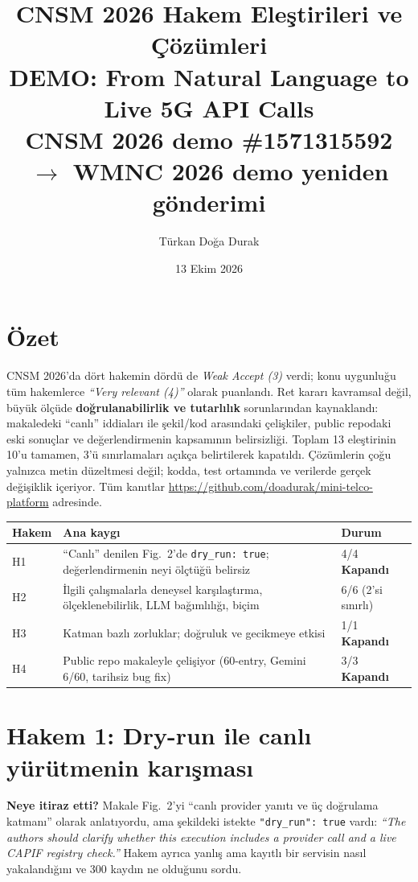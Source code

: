 \documentclass[10pt,a4paper]{article}
\title{\textbf{CNSM 2026 Hakem Eleştirileri ve Çözümleri}\\[2pt]
\large DEMO: From Natural Language to Live 5G API Calls\\
\normalsize CNSM 2026 demo \#1571315592 $\rightarrow$ WMNC 2026 demo yeniden gönderimi}
\author{Türkan Doğa Durak}
\date{13 Ekim 2026}
\newcommand{\ok}{\textcolor{green!50!black}{\textbf{Kapandı}}}
\newcommand{\q}[1]{\textit{``#1''}}
\begin{document}
\maketitle

\section*{Özet}
CNSM 2026'da dört hakemin dördü de \textit{Weak Accept (3)} verdi; konu uygunluğu tüm hakemlerce
\q{Very relevant (4)} olarak puanlandı. Ret kararı kavramsal değil, büyük ölçüde \textbf{doğrulanabilirlik ve
tutarlılık} sorunlarından kaynaklandı: makaledeki ``canlı'' iddiaları ile şekil/kod arasındaki çelişkiler,
public repodaki eski sonuçlar ve değerlendirmenin kapsamının belirsizliği. Toplam 13 eleştirinin 10'u tamamen,
3'ü sınırlamaları açıkça belirtilerek kapatıldı. Çözümlerin çoğu yalnızca metin düzeltmesi değil; kodda,
test ortamında ve verilerde gerçek değişiklik içeriyor. Tüm kanıtlar
\url{https://github.com/doadurak/mini-telco-platform} adresinde.

\begin{table}[h]
\centering\small
\begin{tabularx}{\textwidth}{l L l}
\toprule
\textbf{Hakem} & \textbf{Ana kaygı} & \textbf{Durum} \\
\midrule
H1 & ``Canlı'' denilen Fig.~2'de \texttt{dry\_run: true}; değerlendirmenin neyi ölçtüğü belirsiz & 4/4 \ok \\
H2 & İlgili çalışmalarla deneysel karşılaştırma, ölçeklenebilirlik, LLM bağımlılığı, biçim & 6/6 (2'si sınırlı) \\
H3 & Katman bazlı zorluklar; doğruluk ve gecikmeye etkisi & 1/1 \ok \\
H4 & Public repo makaleyle çelişiyor (60-entry, Gemini 6/60, tarihsiz bug fix) & 3/3 \ok \\
\bottomrule
\end{tabularx}
\end{table}

\section{Hakem 1: Dry-run ile canlı yürütmenin karışması}
\textbf{Neye itiraz etti?} Makale Fig.~2'yi ``canlı provider yanıtı ve üç doğrulama katmanı'' olarak anlatıyordu,
ama şekildeki istekte \texttt{"dry\_run": true} vardı: \q{The authors should clarify whether this execution includes a
provider call and a live CAPIF registry check.} Hakem ayrıca yanlış ama kayıtlı bir servisin nasıl yakalandığını ve
300 kaydın ne olduğunu sordu.
\end{document}
